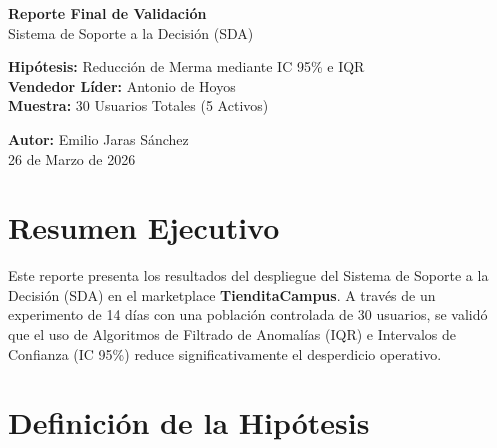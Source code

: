 \documentclass[12pt, a4paper]{article}
\begin{document}
\begin{titlepage}
    \centering
    \vspace*{2cm}
    \vspace{1.5cm}
    
    {\Huge\bfseries\textcolor{primaryblue}{Reporte Final de Validación}\\[0.4cm]}
    {\Large\textcolor{primaryblue!70}{Sistema de Soporte a la Decisión (SDA)}}
    
    \vspace{1.5cm}
    \textbf{Hipótesis:} Reducción de Merma mediante IC 95\% e IQR\\[0.3cm]
    \textbf{Vendedor Líder:} Antonio de Hoyos\\[0.3cm]
    \textbf{Muestra:} 30 Usuarios Totales (5 Activos)
    
    \vfill
    {\large\textbf{Autor:} Emilio Jaras Sánchez}\\[0.2cm]
    {\normalsize 26 de Marzo de 2026}
\end{titlepage}

\tableofcontents
\newpage

\section{Resumen Ejecutivo}
Este reporte presenta los resultados del despliegue del Sistema de Soporte a la Decisión (SDA) en el marketplace \textbf{TienditaCampus}. A través de un experimento de 14 días con una población controlada de 30 usuarios, se validó que el uso de Algoritmos de Filtrado de Anomalías (IQR) e Intervalos de Confianza (IC 95\%) reduce significativamente el desperdicio operativo.

\section{Definición de la Hipótesis}
\end{document}
